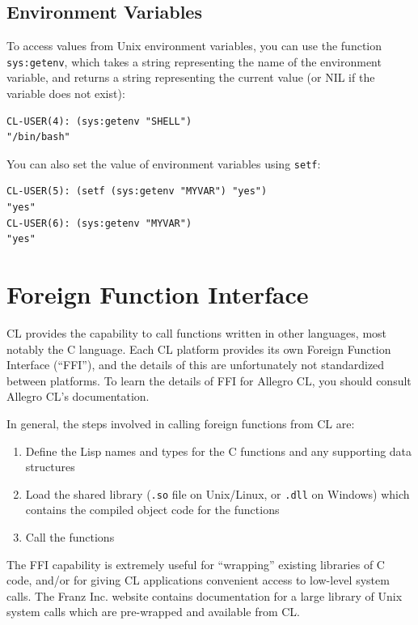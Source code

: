 \subsection{Environment Variables}

To access values from Unix environment variables, you can use the function \texttt{sys:getenv},
which takes a string representing the name of the environment variable, and returns a string
representing the current value (or NIL if the variable does not exist):

\begin{verbatim}
CL-USER(4): (sys:getenv "SHELL")
"/bin/bash"
\end{verbatim}

You can also set the value of environment variables using \texttt{setf}:

\begin{verbatim}
CL-USER(5): (setf (sys:getenv "MYVAR") "yes")
"yes"
CL-USER(6): (sys:getenv "MYVAR")
"yes"
\end{verbatim}

\section{Foreign Function Interface}

CL provides the capability to call functions written in other languages, most notably the C
language. Each CL platform provides its own Foreign Function Interface (``FFI''), and the
details of this are unfortunately not standardized between platforms. To learn the details
of FFI for Allegro CL, you should consult Allegro CL's documentation.

In general, the steps involved in calling foreign functions from CL are:

\begin{enumerate}
\item Define the Lisp names and types for the C functions and any supporting data structures

\item Load the shared library (\texttt{.so} file on Unix/Linux, or \texttt{.dll} on Windows) which contains
the compiled object code for the functions

\item Call the functions
\end{enumerate}

The FFI capability is extremely useful for ``wrapping'' existing libraries of C code, and/or
for giving CL applications convenient access to low-level system calls. The Franz Inc. website
contains documentation for a large library of Unix system calls which are pre-wrapped and
available from CL.

